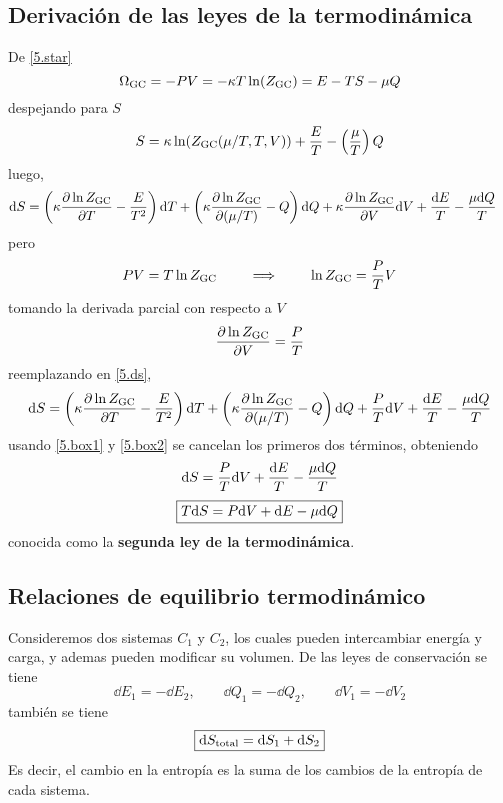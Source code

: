 \subsection{Derivación de las leyes de la termodinámica}
De \eqref{5.star}
\begin{equation}
  \Omega_{\rm GC}=-PV=-\kappa T\ln (Z_{\rm GC})=E-TS-\mu Q
\end{equation}
despejando para $S$
\begin{equation}
  S=\kappa \ln(Z_{\rm GC}(\mu /T,T,V))+\frac{E}{T}-\left(\frac{\mu }{T}\right)Q
\end{equation}
luego,
\begin{align}\label{5.ds}
  \dd S&=\left(\kappa\pdv{\ln Z_{\rm GC}}{T}-\frac{E}{T^2}\right)\dd T+\left(\kappa\pdv{\ln Z_{\rm GC}}{(\mu/T)}-Q\right)\dd Q+\kappa\pdv{\ln Z_{\rm GC}}{V}\dd V+\frac{\dd E}{T}-\frac{\mu\dd Q}{T}
\end{align}
pero 
\begin{equation}
  PV= T\ln Z_{\rm GC} \qquad \implies\qquad \ln Z_{\rm GC}=\frac{P}{T}V
\end{equation}
tomando la derivada parcial con respecto a $V$
\begin{equation}
  \pdv{\ln Z_{\rm GC}}{V}=\frac{P}{T}
\end{equation}
reemplazando en \eqref{5.ds},
\begin{align}
  \dd S=\left(\kappa\pdv{\ln Z_{\rm GC}}{T}-\frac{E}{T^2}\right)\dd T+\left(\kappa\pdv{\ln Z_{\rm GC}}{(\mu/T)}-Q\right)\dd Q+\frac{P}{T}\dd V+\frac{\dd E}{T}-\frac{\mu\dd Q}{T}
\end{align}
usando \eqref{5.box1} y \eqref{5.box2} se cancelan los primeros dos términos, obteniendo
\begin{equation}
  \dd S=\frac{P}{T}\dd V+\frac{\dd E}{T}-\frac{\mu\dd Q}{T}
\end{equation}
\begin{equation}
 \boxed{ T\dd S=P\dd V+\dd E-\mu\dd Q}
\end{equation}
conocida como la \textbf{segunda ley de la termodinámica}.

\subsection{Relaciones de equilibrio termodinámico}
Consideremos dos sistemas $C_1$ y $C_2$, los cuales pueden intercambiar energía y carga, y ademas pueden modificar su volumen. De las leyes de conservación se tiene
\begin{equation}
  \boxed{\dd E_1=-\dd E_2,\qquad \dd Q_1=-\dd Q_2,\qquad \dd V_1=-\dd V_2}
\end{equation}
también se tiene
\begin{equation}
 \boxed{ \dd S_{\rm total}=\dd S_1+\dd S_2}
\end{equation}
Es decir, el cambio en la entropía es la suma de los cambios de la entropía de cada sistema.


